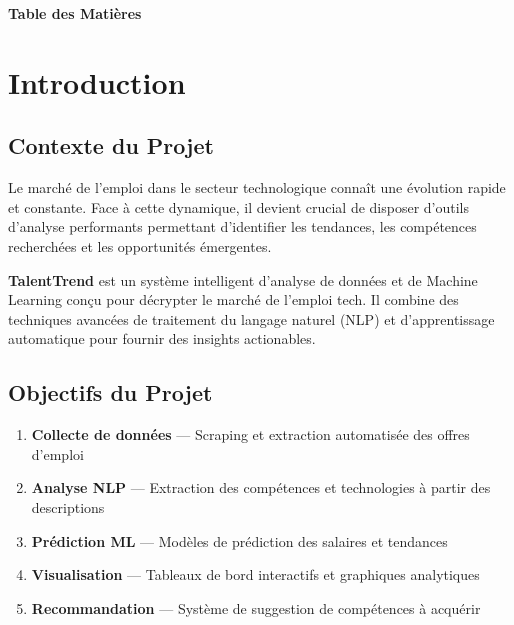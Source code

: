 \documentclass[12pt, a4paper]{report}
\begin{document}
\vspace*{-1cm}
{\color{white}\Huge\bfseries{} Table des Matières}
\vspace{1cm}

\tableofcontents
\newpage

\chapter{Introduction}

\section{Contexte du Projet}

Le marché de l'emploi dans le secteur technologique connaît une évolution rapide et constante. Face à cette dynamique, il devient crucial de disposer d'outils d'analyse performants permettant d'identifier les tendances, les compétences recherchées et les opportunités émergentes.

\begin{infobox}
\textbf{TalentTrend} est un système intelligent d'analyse de données et de Machine Learning conçu pour décrypter le marché de l'emploi tech. Il combine des techniques avancées de traitement du langage naturel (NLP) et d'apprentissage automatique pour fournir des insights actionables.
\end{infobox}

\section{Objectifs du Projet}

\begin{keypoint}[title={\faIcon{bullseye} Objectifs Principaux}]
\begin{enumerate}[label=\textcolor{primaryblue}{\arabic*.}]
    \item \textbf{Collecte de données} --- Scraping et extraction automatisée des offres d'emploi
    \item \textbf{Analyse NLP} --- Extraction des compétences et technologies à partir des descriptions
    \item \textbf{Prédiction ML} --- Modèles de prédiction des salaires et tendances
    \item \textbf{Visualisation} --- Tableaux de bord interactifs et graphiques analytiques
    \item \textbf{Recommandation} --- Système de suggestion de compétences à acquérir
\end{enumerate}
\end{keypoint}
\end{document}

